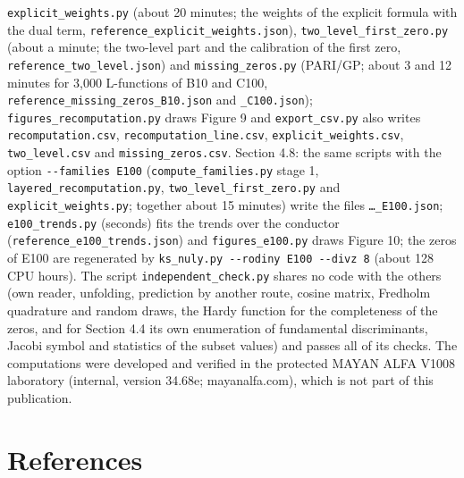 \documentclass[
  10pt,
]{article}
\begin{document}
\texttt{explicit\_weights.py} (about 20 minutes; the weights of the
explicit formula with the dual term,
\texttt{reference\_explicit\_weights.json}),
\texttt{two\_level\_first\_zero.py} (about a minute; the two-level part
and the calibration of the first zero,
\texttt{reference\_two\_level.json}) and \texttt{missing\_zeros.py}
(PARI/GP; about 3 and 12 minutes for 3,000 L-functions of B10 and C100,
\texttt{reference\_missing\_zeros\_B10.json} and \texttt{\_C100.json});
\texttt{figures\_recomputation.py} draws Figure 9 and
\texttt{export\_csv.py} also writes \texttt{recomputation.csv},
\texttt{recomputation\_line.csv}, \texttt{explicit\_weights.csv},
\texttt{two\_level.csv} and \texttt{missing\_zeros.csv}. Section 4.8:
the same scripts with the option \texttt{-\/-families\ E100}
(\texttt{compute\_families.py} stage 1,
\texttt{layered\_recomputation.py}, \texttt{two\_level\_first\_zero.py}
and \texttt{explicit\_weights.py}; together about 15 minutes) write the
files \texttt{…\_E100.json}; \texttt{e100\_trends.py} (seconds) fits the
trends over the conductor (\texttt{reference\_e100\_trends.json}) and
\texttt{figures\_e100.py} draws Figure 10; the zeros of E100 are
regenerated by \texttt{ks\_nuly.py\ -\/-rodiny\ E100\ -\/-divz\ 8}
(about 128 CPU hours). The script \texttt{independent\_check.py} shares
no code with the others (own reader, unfolding, prediction by another
route, cosine matrix, Fredholm quadrature and random draws, the Hardy
function for the completeness of the zeros, and for Section 4.4 its own
enumeration of fundamental discriminants, Jacobi symbol and statistics
of the subset values) and passes all of its checks. The computations
were developed and verified in the protected MAYAN ALFA V1008 laboratory
(internal, version 34.68e; mayanalfa.com), which is not part of this
publication.

\hypertarget{references}{%
\section{References}\label{references}}
\small
\end{document}
